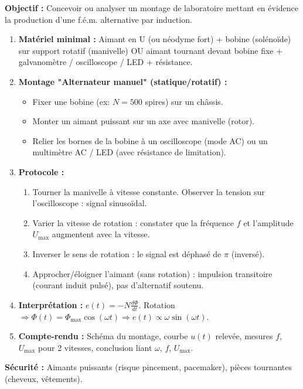 \documentclass[11pt]{article}
\begin{document}
\begin{methode}
    \textbf{Objectif :} Concevoir ou analyser un montage de laboratoire mettant en évidence la production d'une f.é.m. alternative par induction.
    \begin{enumerate}
        \item \textbf{Matériel minimal :} Aimant en U (ou néodyme fort) + bobine (solénoïde) sur support rotatif (manivelle) OU aimant tournant devant bobine fixe + galvanomètre / oscilloscope / LED + résistance.
        \item \textbf{Montage "Alternateur manuel" (statique/rotatif) :}
        \begin{itemize}
            \item Fixer une bobine (ex: $N=500$ spires) sur un châssis.
            \item Monter un aimant puissant sur un axe avec manivelle (rotor).
            \item Relier les bornes de la bobine à un oscilloscope (mode AC) ou un multimètre AC / LED (avec résistance de limitation).
        \end{itemize}
        \item \textbf{Protocole :}
        \begin{enumerate}
            \item Tourner la manivelle à vitesse constante. Observer la tension sur l'oscilloscope : signal sinusoïdal.
            \item Varier la vitesse de rotation : constater que la fréquence $f$ et l'amplitude $U_{\text{max}}$ augmentent avec la vitesse.
            \item Inverser le sens de rotation : le signal est déphasé de $\pi$ (inversé).
            \item Approcher/éloigner l'aimant (sans rotation) : impulsion transitoire (courant induit pulsé), pas d'alternatif soutenu.
        \end{enumerate}
        \item \textbf{Interprétation :} $e(t) = -N \frac{d\Phi}{dt}$. Rotation $\Rightarrow \Phi(t) = \Phi_{\text{max}}\cos(\omega t) \Rightarrow e(t) \propto \omega \sin(\omega t)$.
        \item \textbf{Compte-rendu :} Schéma du montage, courbe $u(t)$ relevée, mesures $f$, $U_{\text{max}}$ pour 2 vitesses, conclusion liant $\omega$, $f$, $U_{\text{max}}$.
    \end{enumerate}
    \textbf{Sécurité :} Aimants puissants (risque pincement, pacemaker), pièces tournantes (cheveux, vêtements).
\end{methode}
\end{document}
